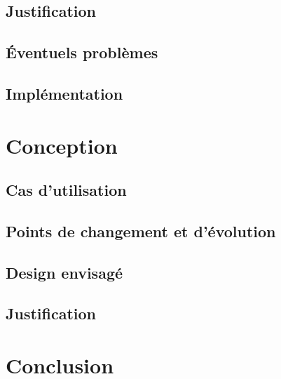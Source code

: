 \documentclass{report}
\begin{document}
	\section{Justification}
		 \label{justification}

	\section{Éventuels problèmes}
		 \label{problemes}
	
	\section{Implémentation}
		 \label{implementation}
		

\chapter{Conception}
			
	\section{Cas d'utilisation}
			 \label{cas_utilisation}
			
	\section{Points de changement et d'évolution}
			 \label{changement}
			 \label{evolution}
			
	\section{Design envisagé}
			 \label{design}
			
	\section{Justification}
			 \label{justification}
			

\chapter{Conclusion}
			
%		
%		
%		
%		
%
\end{document}

